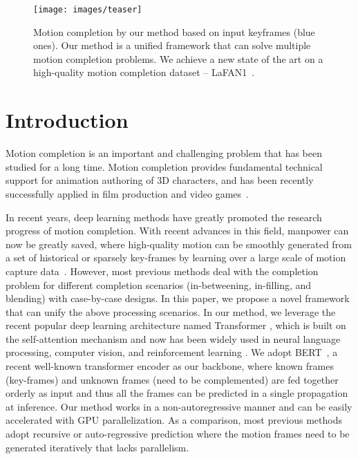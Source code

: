 \documentclass[10pt,twocolumn,letterpaper]{article}
\begin{document}
\begin{figure}[ht]
 \centering
  \texttt{[image: images/teaser]}
  \caption{Motion completion by our method based on input keyframes (blue ones). Our method is a unified framework that can solve multiple motion completion problems. We achieve a new state of the art on a high-quality motion completion dataset -- LaFAN1~\cite{harvey2020robust}. 
  }
  \label{fig:teaser}
\end{figure}
\section{Introduction}

Motion completion is an important and challenging problem that has been studied for a long time. Motion completion provides fundamental technical support for animation authoring of 3D characters, and has been recently successfully applied in film production and video games~\cite{thomas2009integrated, ciccone2019tangent}.

In recent years, deep learning methods have greatly promoted the research progress of motion completion.  With recent advances in this field, manpower can now be greatly saved, where high-quality motion can be smoothly generated from a set of historical or sparsely key-frames by learning over a large scale of motion capture data~\cite{kaufmann2020infilling,harvey2020robust}. However, most previous methods deal with the completion problem for different completion scenarios (in-betweening, in-filling, and blending) with case-by-case designs. In this paper, we propose a novel framework that can unify the above processing scenarios. In our method, we leverage the recent popular deep learning architecture named Transformer \cite{vaswani2017attention}, which is built on the self-attention mechanism and now has been widely used in neural language processing, computer vision, and reinforcement learning \cite{tay2020efficient, dosovitskiy2020VIT, parisotto2020stabilizing}. We adopt BERT~\cite{devlin2018bert}, a recent well-known transformer encoder as our backbone, where known frames (key-frames) and unknown frames (need to be complemented) are fed together orderly as input and thus all the frames can be predicted in a single propagation at inference. Our method works in a non-autoregressive manner and can be easily accelerated with GPU parallelization.  As a comparison, most previous methods adopt recursive or auto-regressive prediction where the motion frames need to be generated iteratively that lacks parallelism. 
\end{document}
